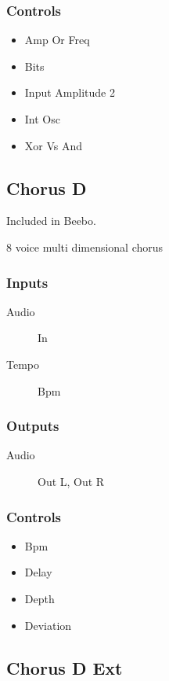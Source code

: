 \subsubsection{Controls}
\begin{itemize}
\item Amp Or Freq
\item Bits
\item Input Amplitude 2
\item Int Osc
\item Xor Vs And
\end{itemize}

\subsection{Chorus D}

Included in Beebo.

8 voice multi dimensional chorus



\subsubsection{Inputs}
\begin{description}
\item [Audio] In
\item [Tempo] Bpm
\end{description}

\subsubsection{Outputs}
\begin{description}
\item [Audio] Out L, Out R
\end{description}

\subsubsection{Controls}
\begin{itemize}
\item Bpm
\item Delay
\item Depth
\item Deviation
\end{itemize}

\subsection{Chorus D Ext}

